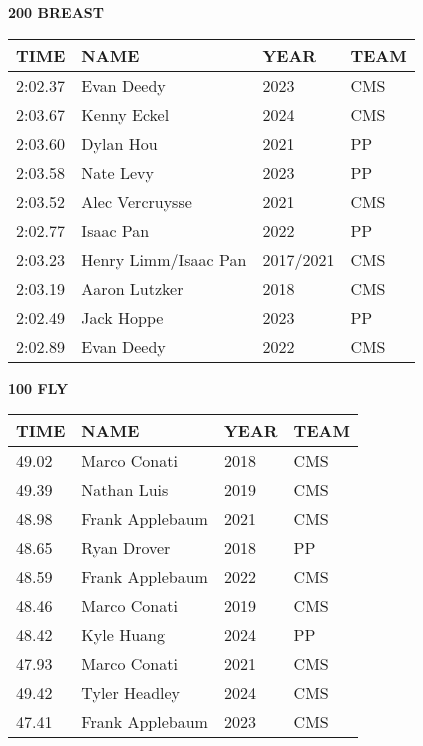 \vspace{0.4cm}

\begin{minipage}[t]{0.48\textwidth}
\centering
\textbf{200 BREAST}\\[0.05cm]
\begin{tabular}{@{}p{1.8cm}p{2.8cm}p{1.2cm}p{1.4cm}@{}}
\hline
\textbf{TIME} & \textbf{NAME} & \textbf{YEAR} & \textbf{TEAM} \\
\hline
2:02.37 & Evan Deedy & 2023 & CMS \\
2:03.67 & Kenny Eckel & 2024 & CMS \\
2:03.60 & Dylan Hou & 2021 & PP \\
2:03.58 & Nate Levy & 2023 & PP \\
2:03.52 & Alec Vercruysse & 2021 & CMS \\
2:02.77 & Isaac Pan & 2022 & PP \\
2:03.23 & Henry Limm/Isaac Pan & 2017/2021 & CMS \\
2:03.19 & Aaron Lutzker & 2018 & CMS \\
2:02.49 & Jack Hoppe & 2023 & PP \\
2:02.89 & Evan Deedy & 2022 & CMS \\
\hline
\end{tabular}
\end{minipage}\hfill
\begin{minipage}[t]{0.48\textwidth}
\centering
\textbf{100 FLY}\\[0.05cm]
\begin{tabular}{@{}p{1.8cm}p{2.8cm}p{1.2cm}p{1.4cm}@{}}
\hline
\textbf{TIME} & \textbf{NAME} & \textbf{YEAR} & \textbf{TEAM} \\
\hline
49.02 & Marco Conati & 2018 & CMS \\
49.39 & Nathan Luis & 2019 & CMS \\
48.98 & Frank Applebaum & 2021 & CMS \\
48.65 & Ryan Drover & 2018 & PP \\
48.59 & Frank Applebaum & 2022 & CMS \\
48.46 & Marco Conati & 2019 & CMS \\
48.42 & Kyle Huang & 2024 & PP \\
47.93 & Marco Conati & 2021 & CMS \\
49.42 & Tyler Headley & 2024 & CMS \\
47.41 & Frank Applebaum & 2023 & CMS \\
\hline
\end{tabular}
\end{minipage}

